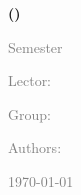 \thispagestyle{empty}
\sffamily


{
	\bfseries

	\vspace*{3.5cm}

	\textcolor{MSBlue}{\sffamily\bfseries\huge\thesis}%

	\vspace*{0.5cm}

	\begin{doublespace} 
		
\textbf{\labtitle{} (\labcode)}

\textbf{\labname}

\textbf{\labdate}	


	\vspace*{10cm}

	\textcolor{gray}{\study}

	\def\termname{Semester}
	\textcolor{gray}{\term{ }\termname}

	\def\lecturername{Lector}
	\textcolor{gray}{\lecturername: \lecturer}

	\def\groupname{Group}
	\textcolor{gray}{\groupname: \group}

	\def\authorname{Authors}
	\textcolor{gray}{\authorname: \student}

	\textcolor{gray}{\today}
	\end{doublespace} 
	\newpage
}